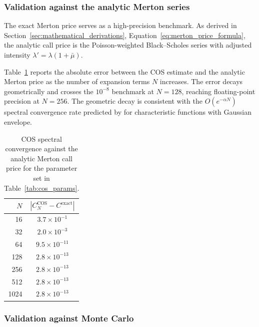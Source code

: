 \documentclass[12pt]{article}
\begin{document}
\subsubsection*{Validation against the analytic Merton series}

The exact Merton price serves as a high-precision benchmark. As
derived in Section~\ref{sec:mathematical_derivations},
Equation~\eqref{eq:merton_price_formula}, the analytic call price is
the Poisson-weighted Black--Scholes series with adjusted intensity
$\lambda' = \lambda(1+\bar{\mu})$.

Table~\ref{tab:cos_convergence} reports the absolute error between
the COS estimate and the analytic Merton price as the number of
expansion terms $N$ increases. The error decays geometrically and
crosses the $10^{-8}$ benchmark at $N=128$, reaching floating-point
precision at $N=256$. The geometric decay is consistent with the
$O(e^{-\alpha N})$ spectral convergence rate predicted by
\citet{FangOosterlee2008} for characteristic functions with
Gaussian envelope.

\begin{table}[ht]
  \centering
  \caption{COS spectral convergence against the analytic Merton call
    price for the parameter set in Table~\ref{tab:cos_params}.}
  \label{tab:cos_convergence}
  \begin{tabular}{rc}
    \toprule
    $N$ & $|C^{\text{COS}}_N - C^{\text{exact}}|$ \\
    \midrule
     16  & $3.7\times10^{-1}$ \\
     32  & $2.0\times10^{-3}$ \\
     64  & $9.5\times10^{-11}$ \\
    128  & $2.8\times10^{-13}$ \\
    256  & $2.8\times10^{-13}$ \\
    512  & $2.8\times10^{-13}$ \\
   1024  & $2.8\times10^{-13}$ \\
    \bottomrule
  \end{tabular}
\end{table}

\subsubsection*{Validation against Monte Carlo}
\end{document}
